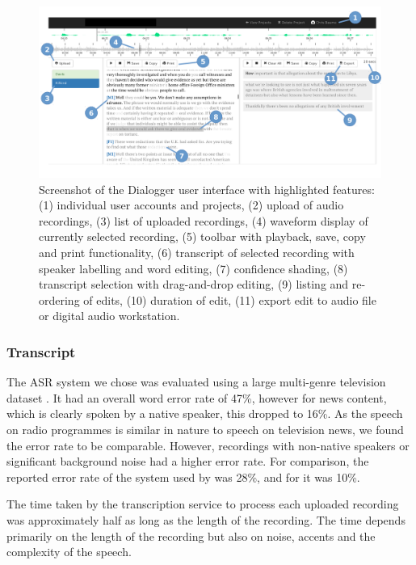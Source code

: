 \begin{figure}[ht]
\centering
  \includegraphics[width=\columnwidth]{figs/interface-labels.pdf}
  \caption[Screenshot of the Dialogger user interface.]{Screenshot of the Dialogger user interface with highlighted
    features: (1) individual user accounts and projects, (2) upload of audio recordings, (3) list of uploaded
    recordings, (4) waveform display of currently selected recording, (5) toolbar with playback, save, copy and print
    functionality, (6) transcript of selected recording with speaker labelling and word editing, (7) confidence
  shading, (8) transcript selection with drag-and-drop editing, (9) listing and re-ordering of edits, (10) duration of
edit, (11) export edit to audio file or digital audio workstation.}
  \label{fig:interface}
\end{figure}

\subsubsection{Transcript}\label{sec:transcript}

The ASR system we chose was evaluated using a large multi-genre television dataset \citep{Bell2015}.  It had an overall
word error rate of 47\%, however for news content, which is clearly spoken by a native speaker, this dropped to 16\%.
As the speech on radio programmes is similar in nature to speech on television news, we found the error rate to be
comparable. However, recordings with non-native speakers or significant background noise had a higher error rate.  For
comparison, the reported error rate of the system used by \citet{Whittaker2004} was 28\%, and for \citet{Sivaraman2016}
it was 10\%.

The time taken by the transcription service to process each uploaded recording was approximately half as long as the
length of the recording. The time depends primarily on the length of the recording but also on noise, accents and the
complexity of the speech.

